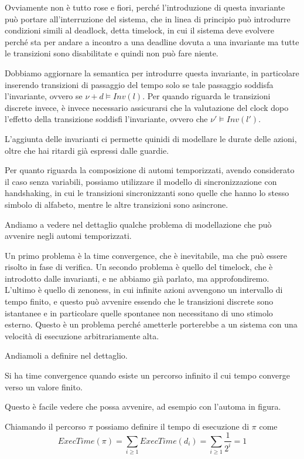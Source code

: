 Ovviamente non è tutto rose e fiori, perché l'introduzione di questa invariante può portare all'interruzione del sistema, che in linea di principio può introdurre condizioni simili al deadlock, detta timelock, in cui il sistema deve evolvere perché sta per andare a incontro a una deadline dovuta a una invariante ma tutte le transizioni sono disabilitate e quindi non può fare niente.

Dobbiamo aggiornare la semantica per introdurre questa invariante, in particolare inserendo transizioni di passaggio del tempo solo se tale passaggio soddisfa l'invariante, ovvero se \(\nu + d \models Inv(l)\). Per quando riguarda le transizioni discrete invece, è invece necessario assicurarsi che la valutazione del clock dopo l'effetto della transizione soddisfi l'invariante, ovvero che \(\nu' \models Inv(l')\).

L'aggiunta delle invarianti ci permette quinidi di modellare le durate delle azioni, oltre che hai ritardi già espressi dalle guardie.

Per quanto riguarda la composizione di automi temporizzati, avendo considerato il caso senza variabili, possiamo utilizzare il modello di sincronizzazione con handshaking, in cui le transizioni sincronizzanti sono quelle che hanno lo stesso simbolo di alfabeto, mentre le altre transizioni sono asincrone.

Andiamo a vedere nel dettaglio qualche problema di modellazione che può avvenire negli automi temporizzati.

Un primo problema è la time convergence, che è inevitabile, ma che può essere risolto in fase di verifica.
Un secondo problema è quello del timelock, che è introdotto dalle invarianti, e ne abbiamo già parlato, ma approfondiremo.
L'ultimo è quello di zenoness, in cui infinite azioni avvengono un intervallo di tempo finito, e questo può avvenire essendo che le transizioni discrete sono istantanee e in particolare quelle spontanee non necessitano di uno stimolo esterno. Questo è un problema perché ametterle porterebbe a un sistema con una velocità di esecuzione arbitrariamente alta.

Andiamoli a definire nel dettaglio.

Si ha time convergence quando esiste un percorso infinito il cui tempo converge verso un valore finito.

Questo è facile vedere che possa avvenire, ad esempio con l'automa in figura.

Chiamando il percorso \(\pi\) possiamo definire il tempo di esecuzione di \(\pi\) come
\[ExecTime(\pi) = \sum_{i \geq 1} ExecTime(d_i) = \sum_{i \geq 1} \frac{1}{2^i} = 1\]

